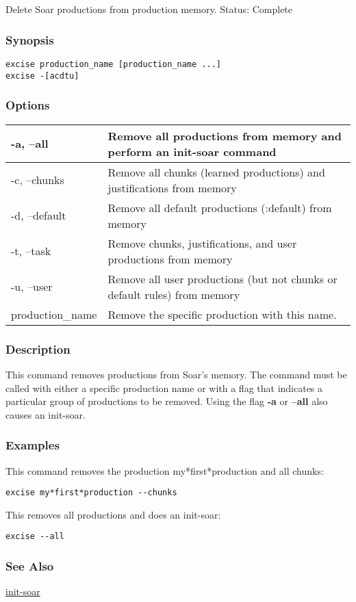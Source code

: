 \subsection{}
\label{excise}
Delete Soar productions from production memory. 
 Status: Complete
\subsubsection*{Synopsis}
  \begin{verbatim}
excise production_name [production_name ...]
excise -[acdtu]
\end{verbatim}
\subsubsection*{Options}
\begin{tabular}{|l|l|}
\hline 
 -a, --all  & Remove all productions from memory and perform an init-soar command  \\
 \hline 
 -c, --chunks  & Remove all chunks (learned productions) and justifications from memory  \\
 \hline 
 -d, --default  & Remove all default productions (:default) from memory  \\
 \hline 
 -t, --task  & Remove chunks, justifications, and user productions from memory  \\
 \hline 
 -u, --user  & Remove all user productions (but not chunks or default rules) from memory  \\
 \hline 
production\_name & Remove the specific production with this name.  \\
 \hline 
\end{tabular}
\subsubsection*{Description}
 This command removes productions from Soar's memory. The command must be called with either a specific production name or with a flag that indicates a particular group of productions to be removed. Using the flag \textbf{-a}
 or \textbf{--all}
 also causes an init-soar. 
\subsubsection*{Examples}
 This command removes the production my*first*production and all chunks: \begin{verbatim}
excise my*first*production --chunks
\end{verbatim}
 This removes all productions and does an init-soar: \begin{verbatim}
excise --all
\end{verbatim}
\subsubsection*{See Also}
\hyperref[init-soar]{init-soar} 